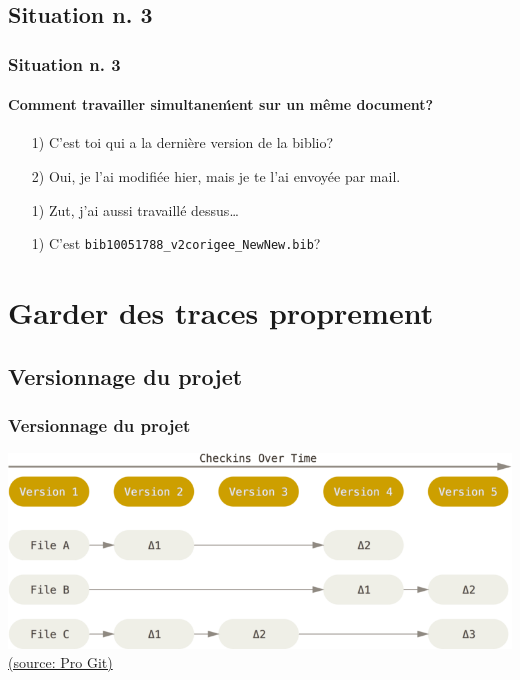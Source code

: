 \documentclass[t,11pt]{beamer}
\begin{document}
\subsection{Situation n. 3}
\begin{frame}[label=sit3,c]
        \frametitle{Situation n. 3}
        \framesubtitle{Comment travailler simultane\'ment sur un même document?}
        \begin{semiverbatim}
        \begin{itemize}
                \item[1)] C'est toi qui a la dernière version de la biblio?
                \item[2)] Oui, je l'ai modifiée hier, mais je te l'ai envoyée par mail. 
                \item[1)] Zut, j'ai aussi travaillé dessus\ldots
                \item[1)] C'est \texttt{bib10051788\_v2corigee\_NewNew.bib}?
        \end{itemize}
        \end{semiverbatim}
\end{frame}

\section{Garder des traces proprement}

\subsection{Versionnage du projet}
\begin{frame}[c]
        \frametitle{Versionnage du projet}
        \includegraphics[width=\linewidth]{./img/deltas}
        \newline
        \hspace*{15pt}
        \href{https://git-scm.com/book/fr/v2/D\%C3\%A9marrage-rapide-Rudiments-de-Git}{{\tiny (source: Pro Git)}}
\end{frame}
\end{document}
